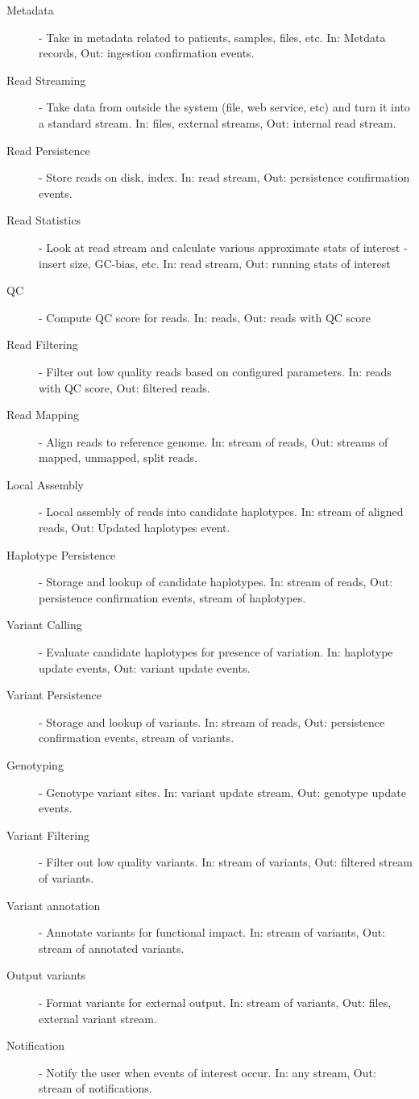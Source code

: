 \begin{description}
    \item [Metadata] - Take in metadata related to patients, samples, files, etc. In: Metdata records, Out: ingestion confirmation events.
    \item [Read Streaming] - Take data from outside the system (file, web service, etc) and turn it into a standard stream. In: files, external streams, Out: internal read stream.
    \item [Read Persistence] - Store reads on disk, index. In: read stream, Out: persistence confirmation events.
    \item [Read Statistics] - Look at read stream and calculate various approximate stats of interest - insert size, GC-bias,  etc. In: read stream, Out: running stats of interest
    \item [QC] - Compute QC score for reads. In: reads, Out: reads with QC score
    \item [Read Filtering] - Filter out low quality reads based on configured parameters. In: reads with QC score, Out: filtered reads.
    \item [Read Mapping] - Align reads to reference genome. In: stream of reads, Out: streams of mapped, unmapped, split reads.
    \item [Local Assembly] - Local assembly of reads into candidate haplotypes. In: stream of aligned reads, Out: Updated haplotypes event.
    \item [Haplotype Persistence] - Storage and lookup of candidate haplotypes. In: stream of reads, Out: persistence confirmation events, stream of haplotypes.
    \item [Variant Calling] - Evaluate candidate haplotypes for presence of variation. In: haplotype update events, Out: variant update events.
    \item [Variant Persistence] - Storage and lookup of variants. In: stream of reads, Out: persistence confirmation events, stream of variants.
    \item [Genotyping] - Genotype variant sites. In: variant update stream, Out: genotype update events.
    \item [Variant Filtering] - Filter out low quality variants. In: stream of variants, Out: filtered stream of variants.
    \item [Variant annotation] - Annotate variants for functional impact. In: stream of variants, Out: stream of annotated variants.
    \item [Output variants] - Format variants for external output. In: stream of variants, Out: files, external variant stream.
    \item [Notification] - Notify the user when events of interest occur. In: any stream, Out: stream of notifications.
\end{description}

